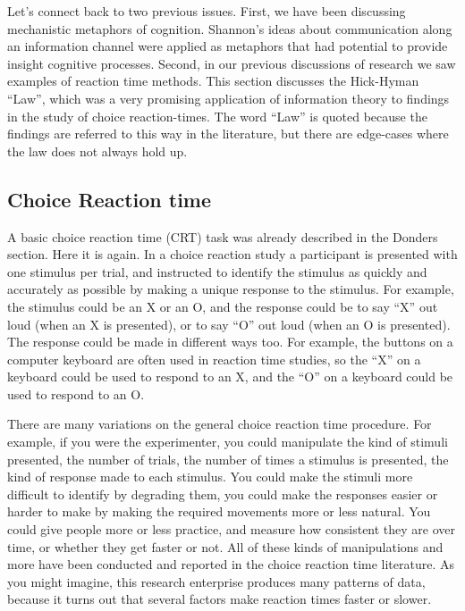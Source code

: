 \documentclass[
  oneside,
  12pt]{crumpbook}
\begin{document}
Let's connect back to two previous issues. First, we have been discussing mechanistic metaphors of cognition. Shannon's ideas about communication along an information channel were applied as metaphors that had potential to provide insight cognitive processes. Second, in our previous discussions of research we saw examples of reaction time methods. This section discusses the Hick-Hyman ``Law'', which was a very promising application of information theory to findings in the study of choice reaction-times. The word ``Law'' is quoted because the findings are referred to this way in the literature, but there are edge-cases where the law does not always hold up.

\hypertarget{choice-reaction-time}{%
\subsection{Choice Reaction time}\label{choice-reaction-time}}

A basic choice reaction time (CRT) task was already described in the Donders section. Here it is again. In a choice reaction study a participant is presented with one stimulus per trial, and instructed to identify the stimulus as quickly and accurately as possible by making a unique response to the stimulus. For example, the stimulus could be an X or an O, and the response could be to say ``X'' out loud (when an X is presented), or to say ``O'' out loud (when an O is presented). The response could be made in different ways too. For example, the buttons on a computer keyboard are often used in reaction time studies, so the ``X'' on a keyboard could be used to respond to an X, and the ``O'' on a keyboard could be used to respond to an O.

There are many variations on the general choice reaction time procedure. For example, if you were the experimenter, you could manipulate the kind of stimuli presented, the number of trials, the number of times a stimulus is presented, the kind of response made to each stimulus. You could make the stimuli more difficult to identify by degrading them, you could make the responses easier or harder to make by making the required movements more or less natural. You could give people more or less practice, and measure how consistent they are over time, or whether they get faster or not. All of these kinds of manipulations and more have been conducted and reported in the choice reaction time literature. As you might imagine, this research enterprise produces many patterns of data, because it turns out that several factors make reaction times faster or slower.
\end{document}
